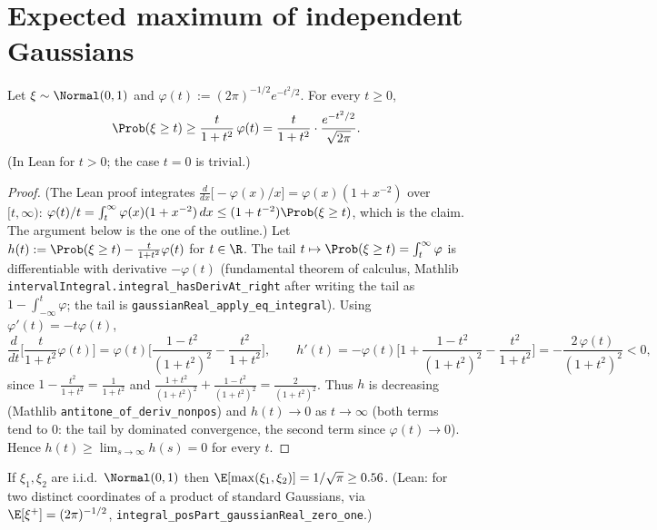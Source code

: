 \section{Expected maximum of independent Gaussians}
\label{sec:pre_sudakov_max}

\begin{lemma}\label{lem:gauss_tail_lower}
\leanok
Let $\xi\sim\Normal(0,1)$ and $\varphi(t) := (2\pi)^{-1/2}e^{-t^2/2}$. For every $t \ge 0$,
\[
  \Prob(\xi\ge t) \ge \frac{t}{1+t^2}\,\varphi(t) = \frac{t}{1+t^2}\cdot\frac{e^{-t^2/2}}{\sqrt{2\pi}} .
\]
(In Lean for $t > 0$; the case $t = 0$ is trivial.)
\end{lemma}

\begin{proof}
\leanok
(The Lean proof integrates $\frac{d}{dx}\big[-\varphi(x)/x\big] = \varphi(x)(1 + x^{-2})$ over
$[t,\infty)$: $\varphi(t)/t = \int_t^\infty\varphi(x)(1+x^{-2})\,dx \le (1+t^{-2})\Prob(\xi\ge t)$,
which is the claim. The argument below is the one of the outline.)
Let $h(t) := \Prob(\xi\ge t) - \frac{t}{1+t^2}\varphi(t)$ for $t\in\R$. The tail
$t\mapsto\Prob(\xi\ge t) = \int_t^\infty\varphi$ is differentiable with derivative $-\varphi(t)$
(fundamental theorem of calculus, Mathlib \texttt{intervalIntegral.integral\_hasDerivAt\_right}
after writing the tail as $1 - \int_{-\infty}^t\varphi$; the tail is
\texttt{gaussianReal\_apply\_eq\_integral}). Using $\varphi'(t) = -t\varphi(t)$,
\[
  \frac{d}{dt}\Big[\frac{t}{1+t^2}\varphi(t)\Big]
  = \varphi(t)\Big[\frac{1-t^2}{(1+t^2)^2} - \frac{t^2}{1+t^2}\Big],
  \qquad
  h'(t) = -\varphi(t)\Big[1 + \frac{1-t^2}{(1+t^2)^2} - \frac{t^2}{1+t^2}\Big]
  = -\frac{2\,\varphi(t)}{(1+t^2)^2} < 0,
\]
since $1 - \frac{t^2}{1+t^2} = \frac{1}{1+t^2}$ and $\frac{1+t^2}{(1+t^2)^2} + \frac{1-t^2}{(1+t^2)^2} = \frac{2}{(1+t^2)^2}$.
Thus $h$ is decreasing (Mathlib \texttt{antitone\_of\_deriv\_nonpos}) and
$h(t)\to 0$ as $t\to\infty$ (both terms tend to $0$: the tail by dominated convergence, the
second term since $\varphi(t)\to 0$). Hence $h(t) \ge \lim_{s\to\infty}h(s) = 0$ for every $t$.
\end{proof}

\begin{lemma}\label{lem:psf_max_two}
\leanok
{}
If $\xi_1,\xi_2$ are i.i.d.\ $\Normal(0,1)$ then $\E[\max(\xi_1,\xi_2)] = 1/\sqrt\pi \ge 0.56$.
(Lean: for two distinct coordinates of a product of standard Gaussians, via
$\E[\xi^+] = (2\pi)^{-1/2}$, \texttt{integral\_posPart\_gaussianReal\_zero\_one}.)
\end{lemma}

